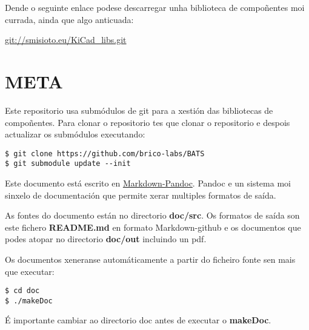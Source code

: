 \documentclass[12pt,galician,]{article}
\begin{document}
Dende o seguinte enlace podese descarregar unha biblioteca de
compoñentes moi currada, ainda que algo anticuada:

\url{git://smisioto.eu/KiCad_libs.git}

\hypertarget{meta}{\section{META}\label{meta}}

Este repositorio usa submódulos de git para a xestión das bibliotecas de
compoñentes. Para clonar o repositorio tes que clonar o repositorio e
despois actualizar os submódulos executando:

\begin{verbatim}
$ git clone https://github.com/brico-labs/BATS
$ git submodule update --init
\end{verbatim}

Este documento está escrito en
\href{http://pandoc.org/README.html}{Markdown-Pandoc}. Pandoc e un
sistema moi sinxelo de documentación que permite xerar multiples
formatos de saída.

As fontes do documento están no directorio \textbf{doc/src}. Os formatos
de saída son este fichero \textbf{README.md} en formato Markdown-github
e os documentos que podes atopar no directorio \textbf{doc/out}
incluindo un pdf.

Os documentos xeneranse automáticamente a partir do ficheiro fonte sen
mais que executar:

\begin{verbatim}
$ cd doc
$ ./makeDoc
\end{verbatim}

É importante cambiar ao directorio doc antes de executar o
\textbf{makeDoc}.
\end{document}
